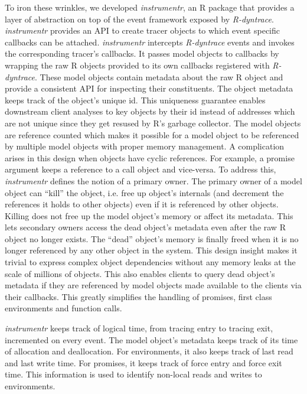 \documentclass[review,nonacm,screen,acmsmall,anonymous=true]{acmart}
\begin{document}
To iron these wrinkles, we developed \emph{instrumentr}, an R package that
provides a layer of abstraction on top of the event framework exposed by
\emph{R-dyntrace}. \emph{instrumentr} provides an API to create tracer objects
to which event specific callbacks can be attached. \emph{instrumentr} intercepts
\emph{R-dyntrace} events and invokes the corresponding tracer's callbacks. It
passes model objects to callbacks by wrapping the raw R objects provided to its
own callbacks registered with \emph{R-dyntrace}. These model objects contain
metadata about the raw R object and provide a consistent API for inspecting
their constituents. The object metadata keeps track of the object's unique id.
This uniqueness guarantee enables downstream client analyses to key objects by
their id instead of addresses which are not unique since they get resused by R's
garbage collector. The model objects are reference counted which makes it
possible for a model object to be referenced by multiple model objects with
proper memory management. A complication arises in this design when objects have
cyclic references. For example, a promise argument keeps a reference to a call
object and vice-versa. To address this, \emph{instrumentr} defines the notion of
a primary owner. The primary owner of a model object can ``kill'' the object,
i.e. free up object's internals (and decrement the references it holds to other
objects) even if it is referenced by other objects. Killing does not free up the
model object's memory or affect its metadata. This lets secondary owners access
the dead object's metadata even after the raw R object no longer exists. The
``dead'' object's memory is finally freed when it is no longer referenced by any
other object in the system. This design insight makes it trivial to express
complex object dependencies without any memory leaks at the scale of millions of
objects. This also enables clients to query dead object's metadata if they are
referenced by model objects made available to the clients via their callbacks.
This greatly simplifies the handling of promises, first class environments and
function calls.

\emph{instrumentr} keeps track of logical time, from tracing
entry to tracing exit, incremented on every event. The model object's metadata
keeps track of its time of allocation and deallocation. For environments, it
also keeps track of last read and last write time. For promises, it keeps track
of force entry and force exit time. This information is used to identify
non-local reads and writes to environments.
\end{document}
